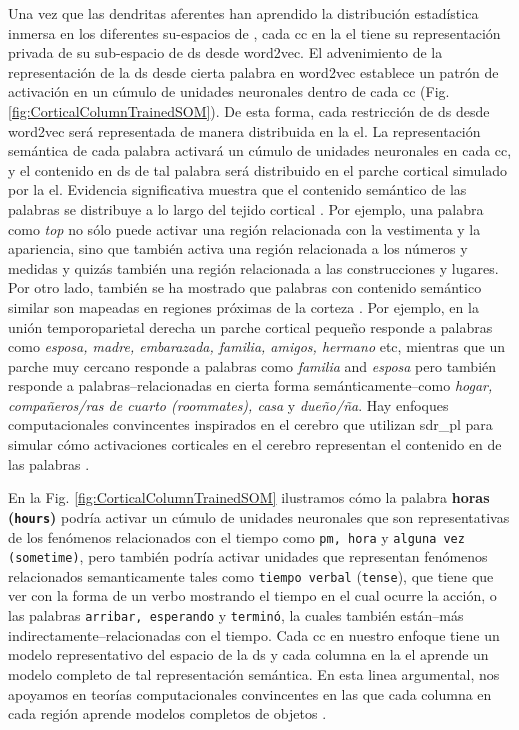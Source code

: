 {Una vez que las dendritas aferentes han aprendido la distribución estadística inmersa en los diferentes su-espacios de , cada \gls{cc} en la \gls{el} tiene su representación privada de su sub-espacio de \gls{ds} desde word2vec.
El advenimiento de la representación de la \gls{ds} desde cierta palabra en word2vec establece un patrón de activación en un cúmulo de unidades neuronales dentro de cada \gls{cc} (Fig. \ref{fig:CorticalColumnTrainedSOM}).
De esta forma, cada restricción de \gls{ds} desde word2vec será representada de manera distribuida en la \gls{el}.
La representación semántica de cada palabra activará un cúmulo de unidades neuronales en cada \gls{cc}, y el contenido en \gls{ds} de tal palabra será distribuido en el parche cortical simulado por la \gls{el}.
Evidencia significativa muestra que el contenido semántico de las palabras se distribuye a lo largo del tejido cortical \cite{huth_natural_2016}.
Por ejemplo, una palabra como \emph{top} no sólo puede activar una región relacionada con la vestimenta y la apariencia, sino que también activa una región relacionada a los números y medidas y quizás también una región relacionada a las construcciones y lugares.
Por otro lado, también se ha mostrado que palabras con contenido semántico similar son mapeadas en regiones próximas de la corteza \cite{pub.1005704802}.
Por ejemplo, en la unión temporoparietal derecha un parche cortical pequeño responde a palabras como \emph{esposa, madre, embarazada, familia, amigos, hermano} etc, mientras que un parche muy cercano responde a palabras como \emph{familia} and \emph{esposa} pero también responde a palabras--relacionadas en cierta forma semánticamente--como \emph{hogar, compañeros/ras de cuarto (roommates), casa} y \emph{dueño/ña}.
Hay enfoques computacionales convincentes inspirados en el cerebro que utilizan \gls{sdr_pl} para simular cómo activaciones corticales en el cerebro representan el contenido en  de las palabras \cite{DBLP:journals/corr/Webber15}.

En la Fig. \ref{fig:CorticalColumnTrainedSOM} ilustramos cómo la palabra \textbf{horas} \textbf{(\texttt{hours})} podría activar un cúmulo de unidades neuronales que son representativas de los fenómenos relacionados con el tiempo como \texttt{pm, hora} y \texttt{alguna vez (sometime)}, pero también podría activar unidades que representan fenómenos relacionados semanticamente tales como \texttt{tiempo verbal} (\texttt{tense}), que tiene que ver con la forma de un verbo mostrando el tiempo en el cual ocurre la acción, o las palabras \texttt{arribar, esperando} y \texttt{terminó}, la cuales también están--más indirectamente--relacionadas con el tiempo.
Cada \gls{cc} en nuestro enfoque tiene un modelo representativo del espacio de la \gls{ds} y cada columna en la \gls{el} aprende un modelo completo de tal representación semántica.
En esta linea argumental, nos apoyamos en teorías computacionales convincentes en las que cada columna en cada región aprende modelos completos de objetos \cite{10.3389/fncir.2018.00121}.

}
